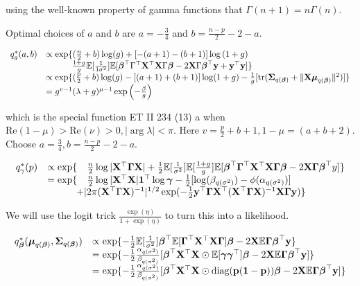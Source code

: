 \documentclass{amsart}[12pt]
\begin{document}
using the well-known property of gamma functions that $\Gamma(n + 1) = n \Gamma(n)$.

Optimal choices of $a$ and $b$ are $a = -\frac{3}{4}$ and $b=\frac{n-p}{2} - 2 - a$.

\begin{equation*}
\begin{array}{rl}
q^*_g(a, b) &\propto \exp \{(\frac{n}{2} + b) \log (g) + [-(a + 1) - (b + 1)] \log{(1 + g)} \\
&\qquad \quad \frac{1 + g}{g} \mathbb{E} [\frac{1}{1 \sigma^2}] \mathbb{E}[{\boldsymbol \beta}^\top \Gamma^\top {\bf X}^\top {\bf X} \Gamma {\boldsymbol\beta} - 2 {\bf X} \Gamma {\boldsymbol\beta}^\top {\bf y} + {\bf y}^\top {\bf y}] \} \\
&\propto \exp \{ (\frac{p}{2} + b) \log (g) - [(a + 1) + (b + 1)] \log (1 + g) - \frac{1}{g}[\text{tr}({\boldsymbol \Sigma}_{q({\boldsymbol \beta})} + \| {\bf X} {\boldsymbol \mu}_{q({\boldsymbol \beta})} \|^2)] \} \\
&= g^{v-1} (\lambda + g)^{\mu - 1} \exp{\left (-\frac{\beta}{g}\right )}
\end{array}
\end{equation*}

\def \Re {\text{Re}}

which is the special function ET II 234 (13) a when $\Re(1 - \mu) > \Re(\nu) > 0, | \arg \lambda | < \pi$. Here
$v = \frac{p}{2} + b + 1, 1 - \mu = (a + b + 2)$. Choose $a = \frac{3}{4}, b = \frac{n - p}{2} - 2 - a$.

\begin{equation*}
\begin{array}{rl}
q^*_\gamma (p) &\propto \exp \{ \quad \frac{n}{2} \log |{\bf X}^\top {\boldsymbol\Gamma} {\bf X}|
															+ \tfrac{1}{2} \mathbb{E}[\frac{1}{\sigma^2}] \mathbb{E}[\frac{1 + g}{g}] 
																\mathbb{E}[{\boldsymbol \beta}^\top {\boldsymbol\Gamma}^\top {\bf X}^\top {\bf X} {\boldsymbol\Gamma} {\boldsymbol\beta} - 2 {\bf X} {\boldsymbol \Gamma} {\boldsymbol \beta}^\top y]\} \\
&= \exp \{\quad \frac{n}{2} \log{|{\bf X}^\top {\bf X}|} {\bf1}^\top \log {\boldsymbol\gamma} - \tfrac{1}{2} [\log (\beta_{q(\sigma^2)}) - \phi(\alpha_{q(\sigma^2)})] \\
&\qquad \quad + |2 \pi ({\bf X}^\top \Gamma {\bf X})^{-1}|^{1/2} \exp(-\tfrac{1}{2} {\bf y}^\top {\boldsymbol\Gamma} {\bf X}^\top ({\bf X}^\top {\boldsymbol\Gamma} {\bf X})^{-1} {\bf X} {\boldsymbol \Gamma} {\bf y}) \}
\end{array}
\end{equation*}

We will use the logit trick $\frac{\exp(\eta)}{1 + \exp(\eta)}$ to turn this into a likelihood.

\begin{equation*}
\begin{array}{rl}
q^*_{\boldsymbol \beta}({\boldsymbol \mu}_{q({\boldsymbol \beta})}, {\boldsymbol \Sigma}_{q({\boldsymbol \beta})}) &\propto \exp \{ -\tfrac{1}{2} \mathbb{E} [\frac{1}{\sigma^2}] {\boldsymbol\beta}^\top \mathbb{E}[ {\boldsymbol \Gamma}^\top {\bf X}^\top {\bf X} {\boldsymbol\Gamma} ] {\boldsymbol\beta} - 2 {\bf X} \mathbb{E} {\boldsymbol \Gamma} {\boldsymbol \beta}^\top {\bf y} \} \\
&= \exp\{ -\tfrac{1}{2} \frac{\alpha_{q(\sigma^2)}}{\beta_{q(\sigma^2)}} [{\boldsymbol \beta}^\top {\bf X}^\top {\bf X} \odot \mathbb{E}[{\boldsymbol \gamma} {\boldsymbol \gamma}^\top] {\boldsymbol\beta} - 2 {\bf X} \mathbb{E} {\boldsymbol \Gamma} {\boldsymbol \beta}^\top {\bf y}] \} \\
&= \exp\{ -\tfrac{1}{2} \frac{\alpha_{q(\sigma^2)}}{\beta_{q(\sigma^2)}} [{\boldsymbol \beta}^\top {\bf X}^\top {\bf X} \odot \text{diag}{({\bf p}({\bf1}- {\bf p}))} {\boldsymbol\beta} - 2 {\bf X} \mathbb{E} {\boldsymbol \Gamma} {\boldsymbol \beta}^\top {\bf y}] \}
\end{array}
\end{equation*}
\end{document}
